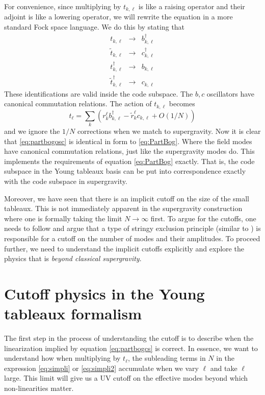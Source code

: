 \documentclass[12pt,nofootinbib, longbibliography]{revtex4-1}
\begin{document}
For convenience, since multiplying by $t_{k,\ell}$ is like a raising operator and their adjoint is like a lowering operator, we will rewrite the equation in a more standard Fock space language. We do this by stating that
\begin{eqnarray}
t_{k,\ell} &\to& b_{k,\ell}^\dagger\\
\tilde t_{k, \ell} &\to& c_{k, \ell}^\dagger\\
t_{k, \ell}^\dagger&\to& b_{k,\ell}\\
\tilde t_{k, \ell}^\dagger&\to& c_{k,\ell}
\end{eqnarray} 
These identifications are valid inside the code subspace. The $b,c$ oscillators have canonical commutation relations.
The action of $t_{k,\ell}$ becomes
\begin{equation}
t_\ell = \sum_k \left( r_k^\ell b^\dagger_{k,\ell} - \tilde r^\ell_k c_{k, \ell}+O(1/N) \right) \label{eq:partbogosc}
\end{equation}
and we ignore the $1/N$ corrections when we match to supergravity. Now it is clear that \eqref{eq:partbogosc} is identical in form to \eqref{eq:PartBog}. Where the field modes have canonical commutation relations, just like the supergravity modes do.
This implements the requirements of equation \eqref{eq:PartBog} exactly. That is, the code subspace in the Young tableaux basis can be put into correspondence exactly with the code subspace in supergravity. 

Moreover, we have seen that there is an implicit cutoff on the size of the small tableaux. This is not immediately apparent in the supergravity construction where one is formally taking the limit  $N\to \infty$ first. To argue for the cutoffs, one needs to follow \cite{McGreevy:2000cw} and argue that a type of stringy exclusion principle (similar to \cite{Maldacena:1998bw}) is responsible for a cutoff on the number of modes and their amplitudes. 
To proceed further, we need to understand the implicit cutoffs explicitly and explore the physics that is {\em beyond classical  supergravity}.

\section{Cutoff physics in the Young tableaux formalism} \label{sec:cutoff}

The first step in the process of understanding the cutoff is to describe when the linearization implied by equation \eqref{eq:partbogcs} is correct.  In essence, we want to understand how  when multiplying by $t_\ell$, the subleading terms in $N$ in the expression \eqref{eq:simpli} or \eqref{eq:simpli2} accumulate when we vary $\ell$ and take $\ell$ large. This limit will give us a UV cutoff on the effective modes beyond which non-linearities matter. 
\end{document}
